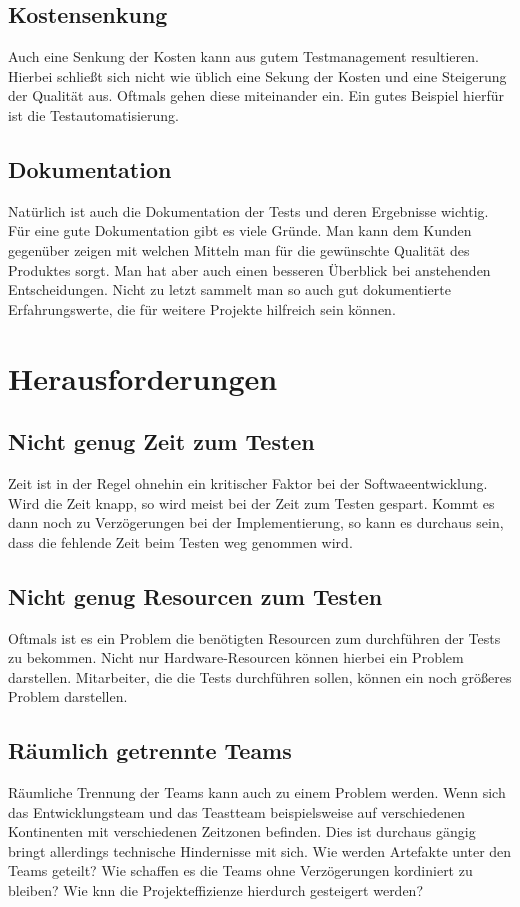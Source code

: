 \section{Kostensenkung}
Auch eine Senkung der Kosten kann aus gutem Testmanagement resultieren. Hierbei schlie\ss{}t sich nicht wie \"ublich eine Sekung der Kosten und eine Steigerung der Qualit\"at aus. Oftmals gehen diese miteinander ein. Ein gutes Beispiel hierf\"ur ist die Testautomatisierung.

\section{Dokumentation}
Nat\"urlich ist auch die Dokumentation der Tests und deren Ergebnisse wichtig. F\"ur eine gute Dokumentation gibt es viele Gr\"unde. Man kann dem Kunden gegen\"uber zeigen mit welchen Mitteln man f\"ur die gew\"unschte Qualit\"at des Produktes sorgt. Man hat aber auch einen besseren \"Uberblick bei anstehenden Entscheidungen. Nicht zu letzt sammelt man so auch gut dokumentierte Erfahrungswerte, die f\"ur weitere Projekte hilfreich sein k\"onnen.

\chapter{Herausforderungen}
\section{Nicht genug Zeit zum Testen}
Zeit ist in der Regel ohnehin ein kritischer Faktor bei der Softwaeentwicklung. Wird die Zeit knapp, so wird meist bei der Zeit zum Testen gespart. Kommt es dann noch zu Verz\"ogerungen bei der Implementierung, so kann es durchaus sein, dass die fehlende Zeit beim Testen weg genommen wird.

\section{Nicht genug Resourcen zum Testen}
Oftmals ist es ein Problem die ben\"otigten Resourcen zum durchf\"uhren der Tests zu bekommen. Nicht nur Hardware-Resourcen k\"onnen hierbei ein Problem darstellen. Mitarbeiter, die die Tests durchf\"uhren sollen, k\"onnen ein noch gr\"o\ss{}eres Problem darstellen.

\section{R\"aumlich getrennte Teams}
R\"aumliche Trennung der Teams kann auch zu einem Problem werden. Wenn sich das Entwicklungsteam und das Teastteam beispielsweise auf verschiedenen Kontinenten mit verschiedenen Zeitzonen befinden. Dies ist durchaus g\"angig bringt allerdings technische Hindernisse mit sich. Wie werden Artefakte unter den Teams geteilt? Wie schaffen es die Teams ohne Verz\"ogerungen kordiniert zu bleiben? Wie knn die Projekteffizienze hierdurch gesteigert werden?

